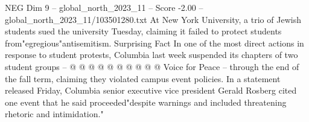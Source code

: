 \begin{textsample}{NEG Dim 9 – global\_north\_2023\_11 – Score -2.00 – global\_north\_2023\_11/103501280.txt}
At New York University, a trio of Jewish students sued the university Tuesday, claiming it failed to protect students from"egregious"antisemitism.
Surprising Fact In one of the most direct actions in response to student protests, Columbia last week suspended its chapters of two student groups -- @ @ @ @ @ @ @ @ @ @ Voice for Peace -- through the end of the fall term, claiming they violated campus event policies.
In a statement released Friday, Columbia senior executive vice president Gerald Rosberg cited one event that he said proceeded"despite warnings and included threatening rhetoric and intimidation."

\end{textsample}
